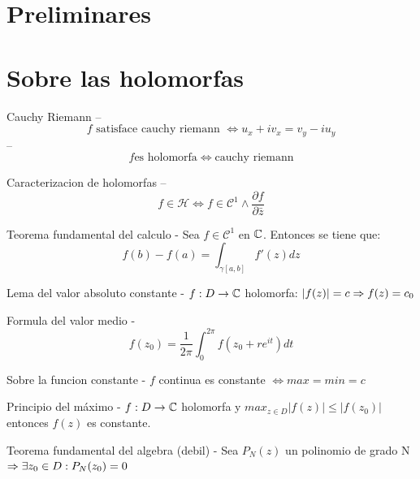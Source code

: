 \section{Preliminares}

\section{Sobre las holomorfas}
\begin{Definition}{Cauchy Riemann}
    -- $$ f \text{ satisface cauchy riemann } \iff u_x + i v_x = v_y - i u_y $$
    -- $$ f \text{es holomorfa} \iff \text{cauchy riemann} $$
\end{Definition}

\begin{Proposition}{Caracterizacion de holomorfas}
    -- $$ f \in \mathcal{H} \iff f \in \mathcal{C}^1 \wedge \frac{\partial f}{\partial \bar{z}} $$
\end{Proposition}

\begin{Theorem}{Teorema fundamental del calculo}
    - Sea $f \in \mathcal{C}^1$ en $\mathbb{C}$. Entonces se tiene que:
    $$ f(b) - f(a) = \int_{\gamma[a, b]} f'(z) dz $$
\end{Theorem}

\begin{Lemma}{Lema del valor absoluto constante}
    - $ f : D \to \mathbb{C} $ holomorfa: $|f(z)| = c \Rightarrow f(z) = c_0 $
\end{Lemma}

\begin{Theorem}{Formula del valor medio}
    - $$ f(z_0) = \frac{1}{2 \pi} \int_{0}^{2\pi} f(z_0 + re^{it}) dt $$
\end{Theorem}

\begin{Proposition}{Sobre la funcion constante}
    - $f $ continua es constante $\iff max = min = c $ 
\end{Proposition}

\begin{Theorem}{Principio del máximo}
    - $ f: D \to \mathbb{C} $ holomorfa y $max_{z \in D} |f(z)| \leq |f(z_0)|$
    entonces $f(z)$ es constante.
\end{Theorem}

\begin{Theorem}{Teorema fundamental del algebra (debil)}
    - Sea $P_N(z) $ un polinomio de grado N $\Rightarrow \exists z_0 \in D: P_N(z_0) = 0$
\end{Theorem}